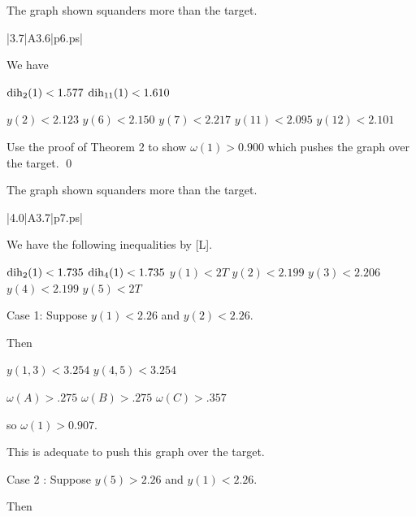  The graph shown 
squanders more than the target.  \endproclaim

\gram|3.7|A3.6|p6.ps|  %

We have 

$\operatorname{dih}_2(1) < 1.577$ \newline
$\operatorname{dih}_{11}(1) < 1.610$ \newline

$y(2)<2.123$ \newline
$y(6)<2.150$ \newline
$y(7)<2.217$ \newline
$y(11)<2.095$ \newline
$y(12)<2.101$ \newline

Use the proof of Theorem 2 to show $\omega(1)>0.900$ which pushes the graph over the target. \qed

\bigskip

 The graph shown 
squanders more than the target.  \endproclaim

\gram|4.0|A3.7|p7.ps|  %


We have the following inequalities by [L].

$\operatorname{dih}_2(1) < 1.735$ \newline
$\operatorname{dih}_4(1) < 1.735$ \newline
$y(1)<2T$ \newline
$y(2)<2.199$ \newline
$y(3)<2.206$ \newline
$y(4)<2.199$ \newline
$y(5)<2T$ \newline


Case 1: Suppose $y(1)<2.26$ and $y(2)<2.26.$

Then 

$y(1,3)<3.254$ \newline
$y(4,5)<3.254$ \newline

$\omega(A)>.275$ \newline
$\omega(B)>.275$ \newline
$\omega(C)>.357$ \newline

so $\omega(1)>0.907$.  

This is adequate to push this graph over the target.


Case 2 : Suppose $y(5)>2.26$ and $y(1)<2.26.$


Then

